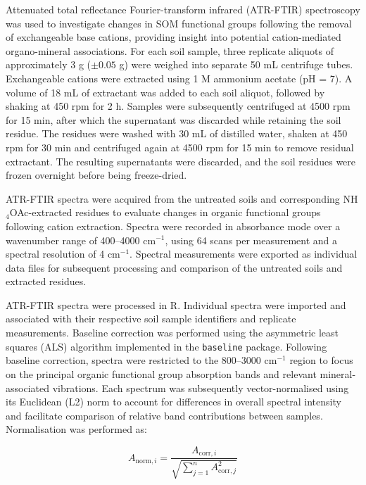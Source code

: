 \documentclass[preprint,12pt]{elsarticle}
\begin{document}
Attenuated total reflectance Fourier-transform infrared (ATR-FTIR) spectroscopy was used to investigate changes in SOM functional groups following the removal of exchangeable base cations, providing insight into potential cation-mediated organo-mineral associations. For each soil sample, three replicate aliquots of approximately 3 g ($\pm 0.05$ g) were weighed into separate 50 mL centrifuge tubes. Exchangeable cations were extracted using 1 M ammonium acetate (pH = 7). A volume of 18 mL of extractant was added to each soil aliquot, followed by shaking at 450 rpm for 2 h. Samples were subsequently centrifuged at 4500 rpm for 15 min, after which the supernatant was discarded while retaining the soil residue. The residues were washed with 30 mL of distilled water, shaken at 450 rpm for 30 min and centrifuged again at 4500 rpm for 15 min to remove residual extractant. The resulting supernatants were discarded, and the soil residues were frozen overnight before being freeze-dried.

ATR-FTIR spectra were acquired from the untreated soils and corresponding NH$_4$OAc-extracted residues to evaluate changes in organic functional groups following cation extraction. Spectra were recorded in absorbance mode over a wavenumber range of 400--4000 cm$^{-1}$, using 64 scans per measurement and a spectral resolution of 4 cm$^{-1}$. Spectral measurements were exported as individual data files for subsequent processing and comparison of the untreated soils and extracted residues.

ATR-FTIR spectra were processed in R. Individual spectra were imported and associated with their respective soil sample identifiers and replicate measurements. Baseline correction was performed using the asymmetric least squares (ALS) algorithm implemented in the \texttt{baseline} package. Following baseline correction, spectra were restricted to the 800--3000 cm$^{-1}$ region to focus on the principal organic functional group absorption bands and relevant mineral-associated vibrations. Each spectrum was subsequently vector-normalised using its Euclidean (L2) norm to account for differences in overall spectral intensity and facilitate comparison of relative band contributions between samples. Normalisation was performed as:

\begin{equation}
A_{\mathrm{norm},i} =
\frac{A_{\mathrm{corr},i}}
{\sqrt{\displaystyle\sum_{j=1}^{n} A_{\mathrm{corr},j}^{2}}}
\label{eq:ftir_vector_normalisation}
\end{equation}
\end{document}
